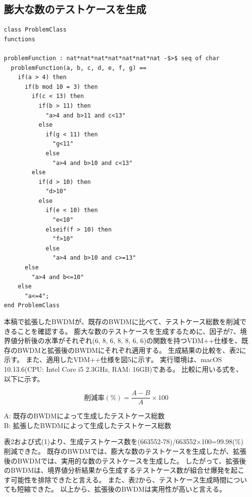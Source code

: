 \documentclass[uplatex, report, a4j, 10pt]{jsbook}
\begin{document}
\subsection{膨大な数のテストケースを生成}
\lstset{language=}
\noindent\begin{minipage}{\textwidth}
  \begin{lstlisting}[caption=因子が7、水準が（6 8 6 8 8 6 6）の関数を持つVDM++仕様。,label=fig:pict4javaIndication]
class ProblemClass
functions

problemFunction : nat*nat*nat*nat*nat*nat*nat -$>$ seq of char
  problemFunction(a, b, c, d, e, f, g) ==
    if(a > 4) then
      if(b mod 10 = 3) then
        if(c < 13) then
          if(b > 11) then
            "a>4 and b>11 and c<13"
          else
            if(g < 11) then
              "g<11"
            else
              "a>4 and b>10 and c<13"
        else
          if(d > 10) then
            "d>10"
          else
            if(e < 10) then
              "e<10"
            elseif(f > 10) then
              "f>10"
            else
              "a>4 and b>10 and c>=13"
      else
        "a>4 and b<=10"
    else
      "a<=4";
end ProblemClass
\end{lstlisting}
\end{minipage}

本稿で拡張したBWDMが、既存のBWDMに比べて、テストケース総数を削減できることを確認する。
膨大な数のテストケースを生成するために、因子が7、境界値分析後の水準がそれぞれ(6, 8, 6, 8, 8, 6, 6)の関数を持つVDM++仕様を、既存のBWDMと拡張後のBWDMにそれぞれ適用する。
生成結果の比較を、表2に示す。
また、適用したVDM++仕様を図5に示す。
実行環境は、macOS 10.13.6(CPU: Intel Core i5 2.3GHz, RAM: 16GB)である。
比較に用いる式を、以下に示す。

\begin{equation}
  削減率(\%) = \frac{A - B}{A} \times 100
\end{equation}

\begin{center}
  A: 既存のBWDMによって生成したテストケース総数\\
  B: 拡張したBWDMによって生成したテストケース総数\\
\end{center}

表2および式(1)より、生成テストケース数を(663552-78)/663552×100=99.98(\%)削減できた。
既存のBWDMでは、膨大な数のテストケースを生成したが、拡張後のBWDMでは、実用的な数のテストケースを生成した。
したがって、拡張後のBWDMは、境界値分析結果から生成するテストケース数が組合せ爆発を起こす可能性を排除できたと言える。
また、表2から、テストケース生成時間についても短縮できた。
以上から、拡張後のBWDMは実用性が高いと言える。
\end{document}
